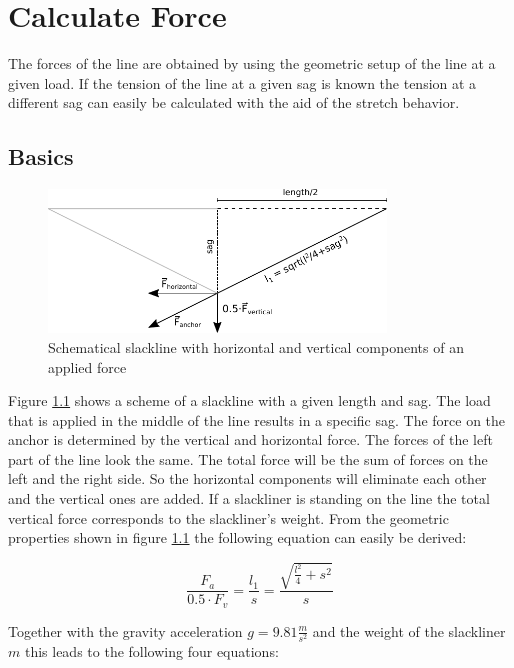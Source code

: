 \chapter{Calculate Force}
The forces of the line are obtained by using the geometric setup of the line at a given load. If the tension of the line at a given sag is known the tension at a different sag can easily be calculated with the aid of the stretch behavior.

\section{Basics} \label{sec:basics}

\begin{figure}[htb] \centering
	\includegraphics[width=0.8\textwidth]{images/slacklineWithForces.pdf}
	\caption{Schematical slackline with horizontal and vertical components of an applied force}
	\label{fig:slacklineWithForces}
\end{figure}

Figure \ref{fig:slacklineWithForces} shows a scheme of a slackline with a given length and sag. The load that is applied in the middle of the line results in a specific sag. The force on the anchor is determined by the vertical and horizontal force. The forces of the left part of the line look the same. The total force will be the sum of forces on the left and the right side. So the horizontal components will eliminate each other and the vertical ones are added. If a slackliner is standing on the line the total vertical force corresponds to the slackliner's weight. From the geometric properties shown in figure \ref{fig:slacklineWithForces} the following equation can easily be derived:


\begin{equation}
	\frac{F_a}{0.5\cdot F_v} = \frac{l_1}{s} = \frac{\sqrt{\frac{l^2}{4} + s^2}}{s}
\end{equation}

Together with the gravity acceleration $g = 9.81\frac{m}{s^2}$ and the weight of the slackliner $m$ this leads to the following four equations:

